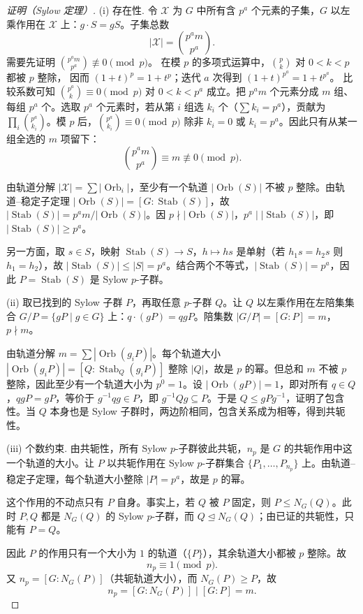 \par\medskip
\begin{proof}[证明（Sylow 定理）]
(i) 存在性. 令 $\mathcal X$ 为 $G$ 中所有含 $p^a$ 个元素的子集，$G$ 以左乘作用在 $\mathcal X$ 上：$g\cdot S=gS$。子集总数
\[
|\mathcal X|=\binom{p^a m}{p^a}.
\]
需要先证明 $\binom{p^a m}{p^a}\not\equiv0\pmod p$。
在模 $p$ 的多项式运算中，$\binom pk$ 对 $0<k<p$ 都被 $p$ 整除，
因而 $(1+t)^p=1+t^p$；迭代 $a$ 次得到
$(1+t)^{p^a}=1+t^{p^a}$。
比较系数可知 $\binom{p^a}{k}\equiv0\pmod p$ 对 $0<k<p^a$ 成立。把 $p^a m$ 个元素分成 $m$ 组、每组 $p^a$ 个。选取 $p^a$ 个元素时，若从第 $i$ 组选 $k_i$ 个（$\sum k_i=p^a$），贡献为 $\prod_i\binom{p^a}{k_i}$。模 $p$ 后，$\binom{p^a}{k_i}\equiv0\pmod{p}$ 除非 $k_i=0$ 或 $k_i=p^a$。因此只有从某一组全选的 $m$ 项留下：
\[
\binom{p^a m}{p^a}\equiv m\not\equiv0\pmod{p}.
\]

由轨道分解 $|\mathcal X|=\sum|\operatorname{Orb}_i|$，至少有一个轨道 $|\operatorname{Orb}(S)|$ 不被 $p$ 整除。由轨道--稳定子定理 $|\operatorname{Orb}(S)|=[G:\operatorname{Stab}(S)]$，故 $|\operatorname{Stab}(S)|=p^a m/|\operatorname{Orb}(S)|$。因 $p\nmid|\operatorname{Orb}(S)|$，$p^a\mid|\operatorname{Stab}(S)|$，即 $|\operatorname{Stab}(S)|\ge p^a$。

另一方面，取 $s\in S$，映射 $\operatorname{Stab}(S)\to S$，$h\mapsto hs$ 是单射（若 $h_1s=h_2s$ 则 $h_1=h_2$），故 $|\operatorname{Stab}(S)|\le|S|=p^a$。结合两个不等式，$|\operatorname{Stab}(S)|=p^a$，因此 $P=\operatorname{Stab}(S)$ 是 Sylow $p$-子群。

(ii) 取已找到的 Sylow 子群 $P$，再取任意 $p$-子群 $Q$。让 $Q$ 以左乘作用在左陪集集合 $G/P=\{gP\mid g\in G\}$ 上：$q\cdot(gP)=qgP$。陪集数 $|G/P|=[G:P]=m$，$p\nmid m$。

由轨道分解 $m=\sum|\operatorname{Orb}(g_iP)|$。每个轨道大小 $|\operatorname{Orb}(g_iP)|=[Q:\operatorname{Stab}_Q(g_iP)]$ 整除 $|Q|$，故是 $p$ 的幂。但总和 $m$ 不被 $p$ 整除，因此至少有一个轨道大小为 $p^0=1$。设 $|\operatorname{Orb}(gP)|=1$，即对所有 $q\in Q$，$qgP=gP$，等价于 $g^{-1}qg\in P$，即 $g^{-1}Qg\subseteq P$。于是 $Q\le gPg^{-1}$，证明了包含性。当 $Q$ 本身也是 Sylow 子群时，两边阶相同，包含关系成为相等，得到共轭性。

(iii) 个数约束. 由共轭性，所有 Sylow $p$-子群彼此共轭，$n_p$ 是 $G$ 的共轭作用中这一个轨道的大小。让 $P$ 以共轭作用在 Sylow $p$-子群集合 $\{P_1,\dots,P_{n_p}\}$ 上。由轨道--稳定子定理，每个轨道大小整除 $|P|=p^a$，故是 $p$ 的幂。

这个作用的不动点只有 $P$ 自身。事实上，若 $Q$ 被 $P$ 固定，则 $P\le N_G(Q)$。此时 $P,Q$ 都是 $N_G(Q)$ 的 Sylow $p$-子群，而 $Q\mathrel{\trianglelefteq} N_G(Q)$；由已证的共轭性，只能有 $P=Q$。

因此 $P$ 的作用只有一个大小为 $1$ 的轨道（$\{P\}$），其余轨道大小都被 $p$ 整除。故
\[
n_p\equiv1\pmod{p}.
\]
又 $n_p=[G:N_G(P)]$（共轭轨道大小），而 $N_G(P)\ge P$，故
\[
n_p=[G:N_G(P)]\mid[G:P]=m.
\]
\end{proof}\par\medskip

